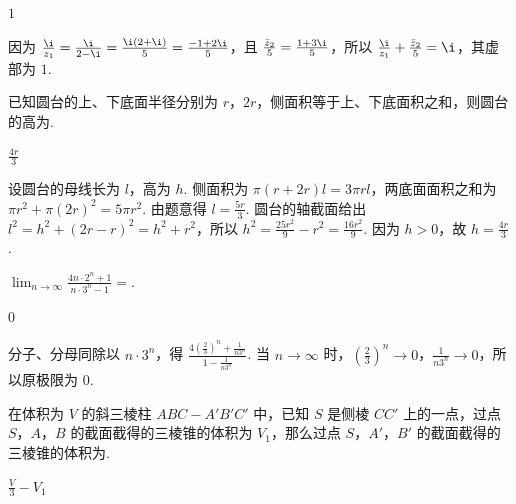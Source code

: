 \documentclass[UTF8,a4paper,oneside,11pt]{ctexbook}
\begin{document}
\begin{answer}
\(1\)
\end{answer}

\begin{solution}
因为 \(\frac{\i}{z_1}=\frac{\i}{2-\i}=\frac{\i(2+\i)}{5}=\frac{-1+2\i}{5}\)，且 \(\frac{\bar z_2}{5}=\frac{1+3\i}{5}\)，所以 \(\frac{\i}{z_1}+\frac{\bar z_2}{5}=\i\)，其虚部为 \(1\).
\end{solution}

\begin{problem}
已知圆台的上、下底面半径分别为 \(r\)，\(2r\)，侧面积等于上、下底面积之和，则圆台的高为\fillinblank{}.
\end{problem}

\begin{answer}
\(\frac{4r}{3}\)
\end{answer}

\begin{solution}
设圆台的母线长为 \(l\)，高为 \(h\). 侧面积为 \(\pi(r+2r)l=3\pi rl\)，两底面面积之和为 \(\pi r^2+\pi(2r)^2=5\pi r^2\). 由题意得 \(l=\frac{5r}{3}\). 圆台的轴截面给出 \(l^2=h^2+(2r-r)^2=h^2+r^2\)，所以 \(h^2=\frac{25r^2}{9}-r^2=\frac{16r^2}{9}\). 因为 \(h>0\)，故 \(h=\frac{4r}{3}\).
\end{solution}

\begin{problem}
\(\displaystyle\lim_{n\to\infty}\frac{4n\cdot 2^n+1}{n\cdot 3^n-1}=\)\fillinblank{}.
\end{problem}

\begin{answer}
\(0\)
\end{answer}

\begin{solution}
分子、分母同除以 \(n\cdot3^n\)，得 \(\frac{4\left(\frac{2}{3}\right)^n+\frac{1}{n3^n}}{1-\frac{1}{n3^n}}\). 当 \(n\to\infty\) 时，\(\left(\frac{2}{3}\right)^n\to0\)，\(\frac{1}{n3^n}\to0\)，所以原极限为 \(0\).
\end{solution}

\begin{problem}
在体积为 \(V\) 的斜三棱柱 \(ABC-A'B'C'\) 中，已知 \(S\) 是侧棱 \(CC'\) 上的一点，过点 \(S\)，\(A\)，\(B\) 的截面截得的三棱锥的体积为 \(V_1\)，那么过点 \(S\)，\(A'\)，\(B'\) 的截面截得的三棱锥的体积为\fillinblank{}.
\end{problem}

\begin{answer}
\(\frac{V}{3}-V_1\)
\end{answer}
\end{document}

